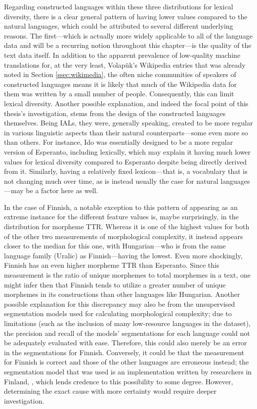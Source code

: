 \documentclass[12pt,a4paper]{article}
\numberwithin{figure}{section}
\numberwithin{table}{section}
\numberwithin{definition}{section}
\begin{document}
Regarding constructed languages within these three distributions for lexical diversity, there is a clear general pattern of having lower values compared to the natural languages, which could be attributed to several different underlying reasons. The first---which is actually more widely applicable to all of the language data and will be a recurring notion throughout this chapter---is the quality of the text data itself. In addition to the apparent prevalence of low-quality machine translations for, at the very least, Volapük's Wikipedia entries that was already noted in Section \ref{ssec:wikimedia}, the often niche communities of speakers of constructed languages means it is likely that much of the Wikipedia data for them was written by a small number of people. Consequently, this can limit lexical diversity. Another possible explanation, and indeed the focal point of this thesis's investigation, stems from the design of the constructed languages themselves. Being IALs, they were, generally speaking, created to be more regular in various linguistic aspects than their natural counterparts---some even more so than others. For instance, Ido was essentially designed to be a more regular version of Esperanto, including lexically, which may explain it having much lower values for lexical diversity compared to Esperanto despite being directly derived from it. Similarly, having a relatively fixed lexicon---that is, a vocabulary that is not changing much over time, as is instead usually the case for natural languages---may be a factor here as well.

In the case of Finnish, a notable exception to this pattern of appearing as an extreme instance for the different feature values is, maybe surprisingly, in the distribution for morpheme TTR. Whereas it is one of the highest values for both of the other two measurements of morphological complexity, it instead appears closer to the median for this one, with Hungarian---who is from the same language family (Uralic) as Finnish---having the lowest. Even more shockingly, Finnish has an even higher morpheme TTR than Esperanto. Since this measurement is the ratio of unique morphemes to total morphemes in a text, one might infer then that Finnish tends to utilize a greater number of unique morphemes in its constructions than other languages like Hungarian. Another possible explanation for this discrepancy may also be from the unsupervised segmentation models used for calculating morphological complexity; due to limitations (such as the inclusion of many low-resource languages in the dataset), the precision and recall of the models' segmentations for each language could not be adequately evaluated with ease. Therefore, this could also merely be an error in the segmentations for Finnish. Conversely, it could be that the measurement for Finnish is correct and those of the other languages are erroneous instead; the segmentation model that was used is an implementation written by researchers in Finland, \textcite{Smit2014inproceedings}, which lends credence to this possibility to some degree. However, determining the exact cause with more certainty would require deeper investigation. 
\end{document}
